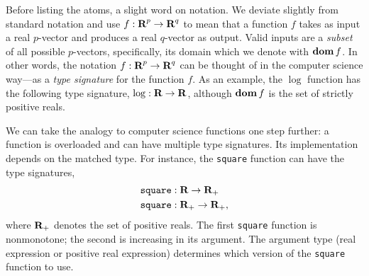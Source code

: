 \documentclass[11pt]{article}
\newcommand{\reals}{{\mbox{\bf R}}}
\newcommand{\dom}{\mathop{\bf dom}}
\begin{document}
Before listing the atoms, a slight word on notation. We deviate slightly from
standard notation and use $f : \reals^p \to \reals^q$ to mean that a function
$f$ takes as input a real $p$-vector and produces a real $q$-vector as
output. Valid inputs are a \emph{subset} of all possible $p$-vectors,
specifically, its domain which we denote with $\dom f$. In other words, the
notation $f : \reals^p \to \reals^q$ can be thought of in the computer
science way---as a \emph{type signature} for the function $f$. As an example,
the $\log$ function has the following type signature, $\log : \reals \to
\reals$, although $\dom f$ is the set of strictly positive reals.

We can take the analogy to computer science functions one step further: a function is overloaded and can have multiple type signatures. Its implementation depends on the matched type. For instance, the {\tt square} function can have the type signatures,
\begin{align*}
{\tt square} &: \reals \to \reals_+ \\
{\tt square} &: \reals_+ \to \reals_+,
\end{align*}
where $\reals_+$ denotes the set of positive reals. The first {\tt square} function is nonmonotone; the second is increasing in its argument. The argument type (real expression or positive real expression) determines which
version of the {\tt square} function to use.
\end{document}
